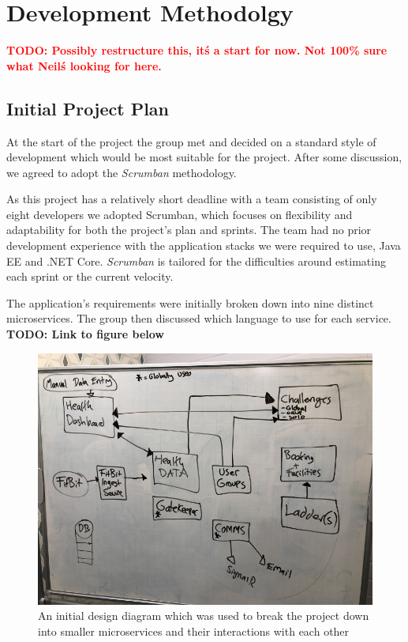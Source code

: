\chapter{Development Methodolgy}

\textcolor{red}{\textbf{TODO: Possibly restructure this, it\'s a start for now. Not 100\% sure what Neil\'s looking for here.}}

\section{Initial Project Plan}
\par
At the start of the project the group met and decided on a standard style of development which would be most suitable for the project. After some discussion, we agreed to adopt the \textit{Scrumban}\cite{scrumban} methodology. 

\par
As this project has a relatively short deadline with a team consisting of only eight developers we adopted Scrumban, which focuses on flexibility and adaptability for both the project's plan and sprints. 
The team had no prior development experience with the application stacks we were required to use, Java EE and .NET Core. \textit{Scrumban} is tailored for the difficulties around estimating each sprint or the current velocity.

\par
The application's requirements were initially broken down into nine distinct microservices. The group then discussed which language to use for each service. \textbf{TODO: Link to figure below}

\begin{figure}[H]
    \centering
    \includegraphics[width=\textwidth]{Images/Initial_Spec_Chart.jpg}
    \caption{An initial design diagram which was used to break the project down into smaller microservices and their interactions with each other}
\end{figure}

